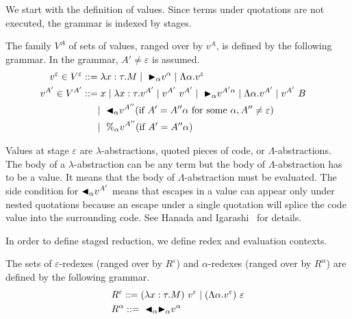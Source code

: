 We start with the definition of values. Since terms under quotations are
not executed, the grammar is indexed by stages.

\begin{definition}[Values]
  The family $V^A$ of sets of values, ranged over by $v^A$,
  is defined by the following grammar.  In the grammar, $A' \neq \varepsilon$ is assumed.
  \begin{align*}
    v^\varepsilon \in V^\varepsilon & ::= \lambda x:\tau.M \mid\ {\mathop{\blacktriangleright}}_\alpha v^\alpha \mid \Lambda\alpha.v^\varepsilon                                             & \\
    v^{A'} \in V^{A'}               & ::= x \mid \lambda x:\tau.v^{A'} \mid v^{A'}\ v^{A'} \mid\ {\mathop{\blacktriangleright}}_\alpha v^{A'\alpha} \mid \Lambda\alpha.v^{A'} \mid v^{A'}\ B & \\
                                    & \quad\   \mid\ {\mathop{\blacktriangleleft}}_\alpha v^{A''} (\text{if } A' = A''\alpha \text{ for some } \alpha, A'' \neq \varepsilon)               & \\
                                    & \quad\   \mid\ \%_\alpha v^{A''} (\text{if } A' = A''\alpha)
  \end{align*}
\end{definition}

Values at stage $\varepsilon$ are $\lambda$-abstractions, quoted pieces of code,
or $\Lambda$-abstractions.  The body of a $\lambda$-abstraction can
be any term but the body of $\Lambda$-abstraction has to be a value.  It
means that the body of $\Lambda$-abstraction must be evaluated.  The
side condition for ${\mathop{\blacktriangleleft}}_\alpha v^{A'}$ means that escapes in a value
can appear only under nested quotations because an escape under a
single quotation will splice the code value into the surrounding
code.  See Hanada and Igarashi~\cite{Hanada2014} for details.

In order to define staged reduction, we define redex and evaluation contexts.

\begin{definition}[Redex]
  The sets of $\varepsilon$-redexes (ranged over by $R^\varepsilon$) and $\alpha$-redexes (ranged over by $R^\alpha$) are defined by the following grammar.
  \begin{align*}
     & R^\varepsilon ::= (\lambda x:\tau.M)\ v^\varepsilon \mid (\Lambda\alpha.v^\varepsilon)\ \varepsilon \\
     & R^\alpha      ::=\ {\mathop{\blacktriangleleft}}_\alpha {\mathop{\blacktriangleright}}_\alpha v^\alpha                                                         \\
  \end{align*}
\end{definition}

